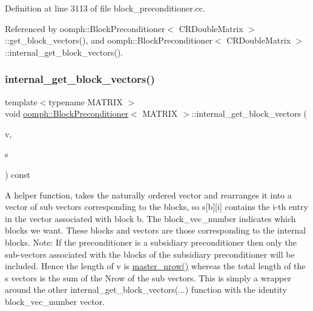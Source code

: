 Definition at line 3113 of file block\+\_\+preconditioner.\+cc.



Referenced by oomph\+::\+Block\+Preconditioner$<$ C\+R\+Double\+Matrix $>$\+::get\+\_\+block\+\_\+vectors(), and oomph\+::\+Block\+Preconditioner$<$ C\+R\+Double\+Matrix $>$\+::internal\+\_\+get\+\_\+block\+\_\+vectors().

\mbox{\label{classoomph_1_1BlockPreconditioner_a0cde8af922cd8054dbf352527dd682b1}} 
\subsubsection{\texorpdfstring{internal\+\_\+get\+\_\+block\+\_\+vectors()}{internal\_get\_block\_vectors()}\hspace{0.1cm}{\footnotesize\ttfamily [2/2]}}
{\footnotesize\ttfamily template$<$typename M\+A\+T\+R\+IX $>$ \\
void \hyperlink{classoomph_1_1BlockPreconditioner}{oomph\+::\+Block\+Preconditioner}$<$ M\+A\+T\+R\+IX $>$\+::internal\+\_\+get\+\_\+block\+\_\+vectors (\begin{DoxyParamCaption}\item[{const \hyperlink{classoomph_1_1DoubleVector}{Double\+Vector} \&}]{v,  }\item[{\hyperlink{classoomph_1_1Vector}{Vector}$<$ \hyperlink{classoomph_1_1DoubleVector}{Double\+Vector} $>$ \&}]{s }\end{DoxyParamCaption}) const}



A helper function, takes the naturally ordered vector and rearranges it into a vector of sub vectors corresponding to the blocks, so s\mbox{[}b\mbox{]}\mbox{[}i\mbox{]} contains the i-\/th entry in the vector associated with block b. The block\+\_\+vec\+\_\+number indicates which blocks we want. These blocks and vectors are those corresponding to the internal blocks. Note\+: If the preconditioner is a subsidiary preconditioner then only the sub-\/vectors associated with the blocks of the subsidiary preconditioner will be included. Hence the length of v is \hyperlink{classoomph_1_1BlockPreconditioner_a3e5b553f65e6c25354a5c908d507e8ee}{master\+\_\+nrow()} whereas the total length of the s vectors is the sum of the Nrow of the sub vectors. This is simply a wrapper around the other internal\+\_\+get\+\_\+block\+\_\+vectors(...) function with the identity block\+\_\+vec\+\_\+number vector. 




